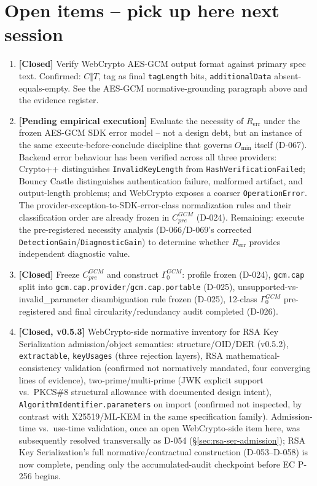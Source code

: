 \documentclass[11pt,a4paper]{article}
\begin{document}
\section{Open items -- pick up here next session}
\begin{enumerate}
\item \textbf{[Closed]} Verify WebCrypto AES-GCM output format against primary spec text. Confirmed: $C\Vert T$, tag as final \texttt{tagLength} bits, \texttt{additionalData} absent-equals-empty. See the AES-GCM normative-grounding paragraph above and the evidence register.
\item \textbf{[Pending empirical execution]} Evaluate the necessity of $R_{\text{err}}$ under the frozen AES-GCM SDK error model -- not a design debt, but an instance of the same execute-before-conclude discipline that governs $O_{\min}$ itself (D-067). Backend error behaviour has been verified across all three providers: Crypto++ distinguishes \texttt{InvalidKeyLength} from \texttt{HashVerificationFailed}; Bouncy Castle distinguishes authentication failure, malformed artifact, and output-length problems; and WebCrypto exposes a coarser \texttt{OperationError}. The provider-exception-to-SDK-error-class normalization rules and their classification order are already frozen in $C_{pre}^{GCM}$ (D-024). Remaining: execute the pre-registered necessity analysis (D-066/D-069's corrected \texttt{DetectionGain}/\texttt{DiagnosticGain}) to determine whether $R_{\text{err}}$ provides independent diagnostic value.
\item \textbf{[Closed]} Freeze $C_{pre}^{GCM}$ and construct $\Gamma_0^{GCM}$: profile frozen (D-024), \texttt{gcm.cap} split into \texttt{gcm.cap.provider}/\texttt{gcm.cap.portable} (D-025), unsupported-vs-invalid\_parameter disambiguation rule frozen (D-025), 12-class $\Gamma_0^{GCM}$ pre-registered and final circularity/redundancy audit completed (D-026).
\item \textbf{[Closed, v0.5.3]} WebCrypto-side normative inventory for RSA Key Serialization admission/object semantics: structure/OID/DER (v0.5.2), \texttt{extractable}, \texttt{keyUsages} (three rejection layers), RSA mathematical-consistency validation (confirmed not normatively mandated, four converging lines of evidence), two-prime/multi-prime (JWK explicit support vs.\ PKCS\#8 structural allowance with documented design intent), \texttt{AlgorithmIdentifier.parameters} on import (confirmed not inspected, by contrast with X25519/ML-KEM in the same specification family). Admission-time vs.\ use-time validation, once an open WebCrypto-side item here, was subsequently resolved transversally as D-054 (\S\ref{sec:rsa-ser-admission}); RSA Key Serialization's full normative/contractual construction (D-053--D-058) is now complete, pending only the accumulated-audit checkpoint before EC P-256 begins.

\end{enumerate}
\end{document}
